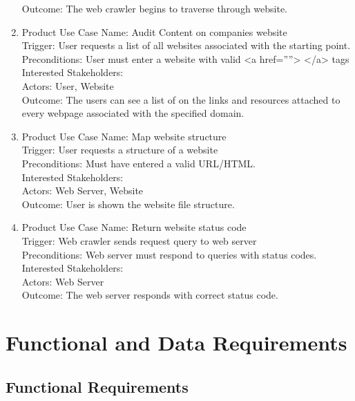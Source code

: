 \documentclass[12pt]{article}
\begin{document}
\begin{enumerate}
Outcome: The web crawler begins to traverse through website.\\
  \item Product Use Case Name: Audit Content on companies website \\
Trigger: User requests a list of all websites associated with the starting point.\\
Preconditions: User must enter a website with valid <a href=””> </a> tags\\
Interested Stakeholders: \\
Actors: User, Website\\
Outcome: The users can see a list of on the links and resources attached to every webpage associated with the specified domain.\\
  \item Product Use Case Name: Map website structure\\
Trigger: User requests a structure of a website\\
Preconditions: Must have entered a valid URL/HTML.\\
Interested Stakeholders: \\
Actors: Web Server, Website\\
Outcome: User is shown the website file structure.\\
  \item Product Use Case Name: Return website status code\\
Trigger: Web crawler sends request query to web server\\
Preconditions: Web server must respond to queries with status codes. \\
Interested Stakeholders: \\
Actors: Web Server\\
Outcome: The web server responds with correct status code.\\
\end{enumerate}

\section{Functional and Data Requirements }
\subsection{Functional Requirements }
\end{document}
